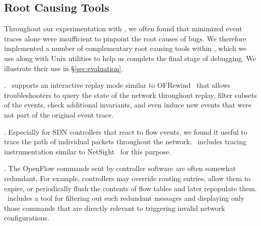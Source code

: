 
\subsection{Root Causing Tools}
\label{subsec:root_causing}

Throughout our experimentation with \projectname, we often found that
minimized event traces alone were insufficient to
pinpoint the root causes of bugs. We therefore implemented a number of
complementary root
causing tools within \projectname,
which we use along with Unix utilities to help us complete the final
stage of debugging. We illustrate their use in \S\ref{sec:evaluation}.

. \projectname~supports an interactive replay mode
similar to OFRewind~\cite{ofrewind} that allows troubleshooters to query the
state of the network throughout replay, filter subsets of the events, check
additional invariants, and
even induce new events that were not part of the original event trace.

. Especially for SDN controllers that react to
flow events, we found it useful to trace the path of individual
packets throughout the network. \projectname~includes tracing instrumentation
similar to NetSight~\cite{ndb14} for this purpose.

. The OpenFlow commands sent by controller software
are often somewhat redundant. For example, controllers may override routing
entries, allow them to expire, or periodically flush the
contents of flow tables and later repopulate them. \projectname~includes a
tool for filtering out such redundant messages and
displaying only those commands that are directly relevant to triggering invalid network
configurations.

